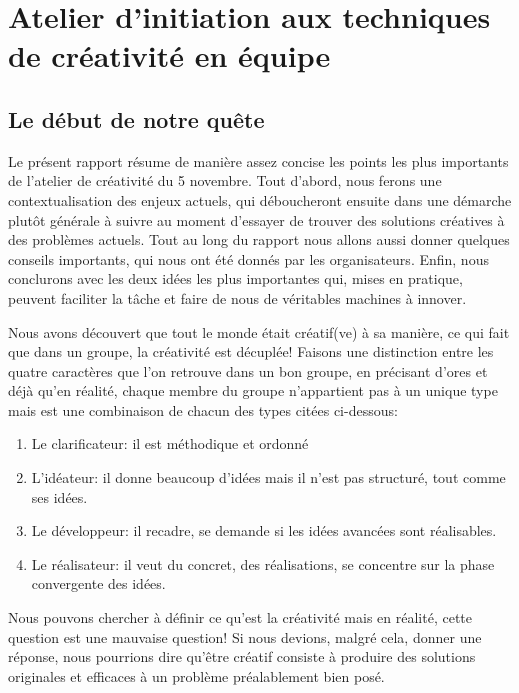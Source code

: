 \section{Atelier d'initiation aux techniques de créativité en équipe}


\subsection{Le début de notre quête}

Le présent rapport résume de manière assez concise les points les plus importants de l'atelier de créativité du 5 novembre. Tout d'abord, nous ferons une contextualisation des enjeux actuels, qui déboucheront ensuite dans une démarche plutôt générale à suivre au moment d'essayer de trouver des solutions créatives à des problèmes actuels. Tout au long du rapport nous allons aussi donner quelques conseils importants, qui nous ont été donnés par les organisateurs. Enfin, nous conclurons avec les deux idées les plus importantes qui, mises en pratique, peuvent faciliter la tâche et faire de nous de véritables machines à innover.

Nous avons découvert que tout le monde était créatif(ve) à sa manière, ce qui fait que dans un groupe, la créativité est décuplée! Faisons une distinction entre les quatre caractères que l'on retrouve dans un bon groupe, en précisant d'ores et déjà qu'en réalité, chaque membre du groupe n’appartient pas à un unique type mais est une combinaison de chacun des types citées ci-dessous:

\begin{enumerate}
\item Le clarificateur: il est méthodique et ordonné
\item L'idéateur: il donne beaucoup d’idées mais il n'est pas structuré, tout comme ses idées.
\item  Le développeur: il recadre, se demande si les idées avancées sont réalisables.
\item Le réalisateur: il veut du concret, des réalisations, se concentre sur la phase convergente des idées.
\end{enumerate}

Nous pouvons chercher à définir ce qu’est la créativité mais en réalité, cette question est une mauvaise question! Si nous devions, malgré cela, donner une réponse, nous pourrions dire qu’être créatif consiste à produire des solutions originales et efficaces à un problème préalablement bien posé. 

